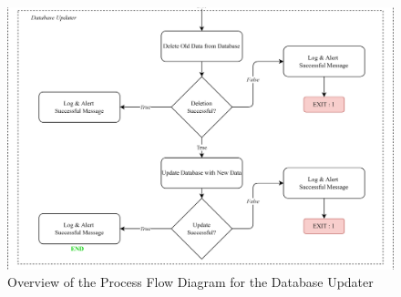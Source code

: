 \begin{figure}[ht]
    \centering
    \includegraphics[width=1\textwidth]{./assets/ProcessFlowchart_DataProcessor3.png}
    \caption{Overview of the Process Flow Diagram for the Database Updater}
    \label{fig:process_flowchart_db_updater}
\end{figure}
\FloatBarrier